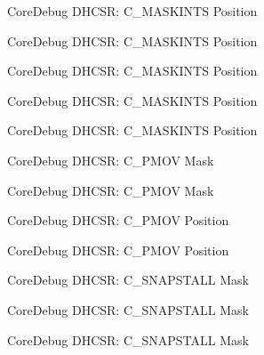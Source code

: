 \begin{DoxyRefList}
\label{deprecated__deprecated000177}%
%
Core\+Debug D\+H\+C\+SR\+: C\+\_\+\+M\+A\+S\+K\+I\+N\+TS Position 

\label{deprecated__deprecated000260}%
%
Core\+Debug D\+H\+C\+SR\+: C\+\_\+\+M\+A\+S\+K\+I\+N\+TS Position 

\label{deprecated__deprecated000319}%
%
Core\+Debug D\+H\+C\+SR\+: C\+\_\+\+M\+A\+S\+K\+I\+N\+TS Position 

\label{deprecated__deprecated000395}%
%
Core\+Debug D\+H\+C\+SR\+: C\+\_\+\+M\+A\+S\+K\+I\+N\+TS Position 

\label{deprecated__deprecated000484}%
%
Core\+Debug D\+H\+C\+SR\+: C\+\_\+\+M\+A\+S\+K\+I\+N\+TS Position  
\item[Member \mbox{\hyperlink{group__CMSIS__CoreDebug_ga6c41fddb98d97a17f3e9020278a1aed1}{Core\+Debug\+\_\+\+D\+H\+C\+S\+R\+\_\+\+C\+\_\+\+P\+M\+O\+V\+\_\+\+Msk}} ]\label{deprecated__deprecated000030}%
%
Core\+Debug D\+H\+C\+SR\+: C\+\_\+\+P\+M\+OV Mask 

\label{deprecated__deprecated000481}%
%
Core\+Debug D\+H\+C\+SR\+: C\+\_\+\+P\+M\+OV Mask  
\item[Member \mbox{\hyperlink{group__CMSIS__CoreDebug_gac414659dd5c8bd9c91ab94441ded720a}{Core\+Debug\+\_\+\+D\+H\+C\+S\+R\+\_\+\+C\+\_\+\+P\+M\+O\+V\+\_\+\+Pos}} ]\label{deprecated__deprecated000029}%
%
Core\+Debug D\+H\+C\+SR\+: C\+\_\+\+P\+M\+OV Position 

\label{deprecated__deprecated000480}%
%
Core\+Debug D\+H\+C\+SR\+: C\+\_\+\+P\+M\+OV Position  
\item[Member \mbox{\hyperlink{group__CMSIS__CoreDebug_ga53aa99b2e39a67622f3b9973e079c2b4}{Core\+Debug\+\_\+\+D\+H\+C\+S\+R\+\_\+\+C\+\_\+\+S\+N\+A\+P\+S\+T\+A\+L\+L\+\_\+\+Msk}} ]\label{deprecated__deprecated000032}%
%
Core\+Debug D\+H\+C\+SR\+: C\+\_\+\+S\+N\+A\+P\+S\+T\+A\+LL Mask 

\label{deprecated__deprecated000176}%
%
Core\+Debug D\+H\+C\+SR\+: C\+\_\+\+S\+N\+A\+P\+S\+T\+A\+LL Mask 

\label{deprecated__deprecated000318}%
%
Core\+Debug D\+H\+C\+SR\+: C\+\_\+\+S\+N\+A\+P\+S\+T\+A\+LL Mask 


\end{DoxyRefList}
